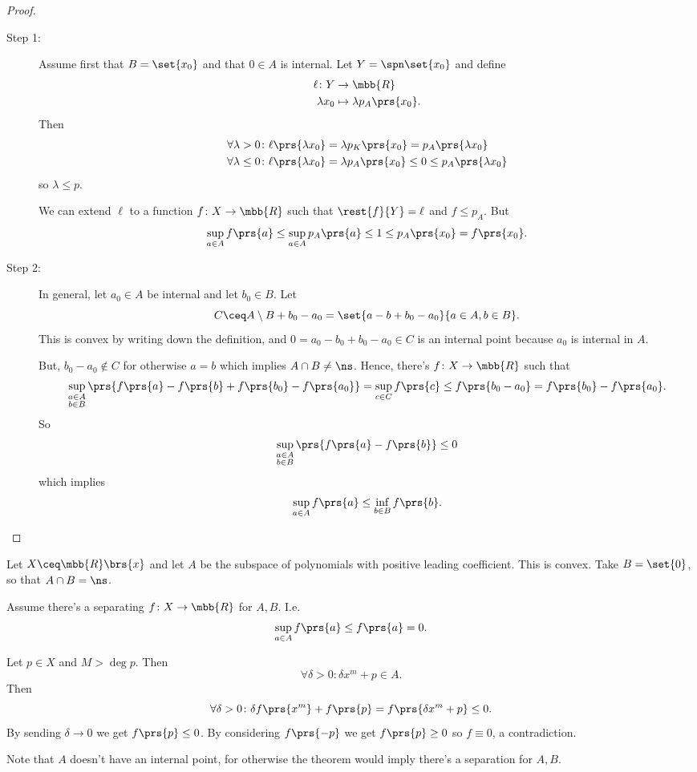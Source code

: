 \documentclass[10pt, twoside]{book}
\begin{document}
\begin{proof}
\begin{description}
\item[Step 1:]
Assume first that $B = \set{x_0}$ and that $0 \in A$ is internal.
Let $Y = \spn\set{x_0}$ and define
\begin{align*}
\ell \colon Y &\to \mbb{R} \\
\lambda x_0 &\mapsto \lambda p_A\prs{x_0} \text{.}
\end{align*}
Then
\begin{align*}
\forall \lambda >0 \colon \ell\prs{\lambda x_0} &= \lambda p_K\prs{x_0} = p_A\prs{\lambda x_0} \\
\forall \lambda \leq 0 \colon \ell\prs{\lambda x_0} &= \lambda p_A\prs{x_0} \leq 0 \leq p_A\prs{\lambda x_0}
\end{align*}
so $\lambda \leq p$.

We can extend $\ell$ to a function $f \colon X \to \mbb{R}$ such that $\rest{f}{Y} = \ell$ and $f \leq p_A$.
But
\[\sup_{a \in A} f\prs{a} \leq \sup_{a \in A} p_A\prs{a} \leq 1 \leq p_A\prs{x_0} = f\prs{x_0} \text{.}\]

\item[Step 2:]
In general, let $a_0 \in A$ be internal and let $b_0 \in B$. Let
\[C \ceq A \setminus B + b_0 - a_0 = \set{a-b + b_0 - a_0}{a \in A, b \in B} \text{.}\]
This is convex by writing down the definition, and $0 = a_0 - b_0 + b_0 - a_0 \in C$ is an internal point because $a_0$ is internal in $A$.

But, $b_0 - a_0 \notin C$ for otherwise $a=b$ which implies $A \cap B \neq \ns$. Hence, there's $f \colon X \to \mbb{R}$ such that
\[\sup_{\substack{a \in A \\ b \in B}}\prs{f\prs{a} - f\prs{b} + f\prs{b_0} - f\prs{a_0}} = \sup_{c \in C} f\prs{c} \leq f\prs{b_0 - a_0} = f\prs{b_0} - f\prs{a_0}\text{.}\]
So
\[\sup_{\substack{a \in A \\ b \in B}} \prs{f\prs{a} - f\prs{b}} \leq 0\]
which implies
\[\sup_{a \in A} f\prs{a} \leq \inf_{b \in B} f\prs{b} \text{.}\] 
\end{description}
\end{proof}

\begin{example}
Let $X \ceq \mbb{R}\brs{x}$ and let $A$ be the subspace of polynomials with positive leading coefficient. This is convex. Take $B = \set{0}$, so that $A \cap B = \ns$.

Assume there's a separating $f \colon X \to \mbb{R}$ for $A,B$. I.e.
\[\sup_{a \in A} f\prs{a} \leq f\prs{a} = 0 \text{.}\]

Let $p \in X$ and $M > \deg p$. Then
\[\forall \delta >0 \colon \delta x^m + p \in A \text{.}\]
Then
\[\forall \delta > 0 \colon \delta f\prs{x^m} + f\prs{p} = f\prs{\delta x^m + p} \leq 0 \text{.}\]
By sending $\delta \to 0$ we get $f\prs{p} \leq 0$. By considering $f\prs{-p}$ we get $f\prs{p} \geq 0$ so $f \equiv 0$, a contradiction.

Note that $A$ doesn't have an internal point, for otherwise the theorem would imply there's a separation for $A,B$.
\end{example}
\end{document}
